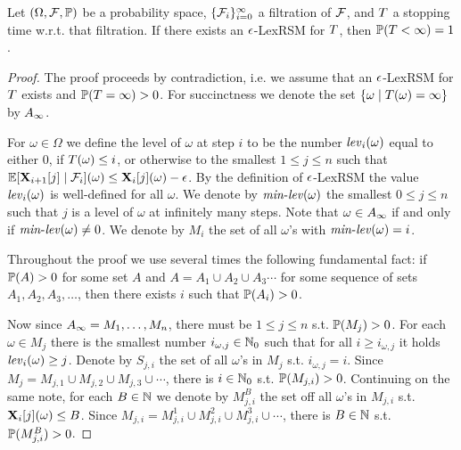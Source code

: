 \begin{theorem}
Let $(\Omega,\mathcal{F},\mathbb{P})$ be a probability space, 
$\{\mathcal{F}_i\}_{i=0}^{\infty}$ a filtration of $\mathcal{F}$, and $T$ a 
stopping 
time w.r.t. that filtration. If there exists an $\epsilon$-LexRSM for $T$, 
then $\mathbb{P}(T<\infty)=1$.
\end{theorem}
\begin{proof}
The proof proceeds by contradiction, i.e. we assume that an $\epsilon$-LexRSM for 
$T$ exists and $\mathbb{P}(T=\infty)>0$. For succinctness we denote the 
set $\{\omega\mid T(\omega)=\infty\}$ by $A_{\infty}$.

For $\omega\in \Omega$ we define the level of $\omega$ at step $i$ to be the 
number $\mathit{lev}_{i}(\omega)$ equal to either $0$, if $T(\omega)\leq i$, 
or otherwise to the smallest $1\leq j \leq n$ such that 
$\mathbb{E}[\mathbf{X}_{i+1}[j]\mid 
\mathcal{F}_i](\omega)\leq\mathbf{X}_{i}[j](\omega)-\epsilon$. By the definition of 
$\epsilon$-LexRSM the value $\mathit{lev}_{i}(\omega)$ is well-defined for all 
$\omega$. We denote by $\mathit{min}\text{-}\mathit{lev}(\omega)$ the smallest $0 \leq j \leq n$ such 
that $j$ is a level of $\omega$ at infinitely many steps. Note that $\omega \in 
A_{\infty}$ if and only if $\mathit{min}\text{-}\mathit{lev}(\omega)\neq 0$. We denote by $M_i$ 
the set of all $\omega$'s with $\mathit{min}\text{-}\mathit{lev}(\omega)=i$.

Throughout the proof we use several times the following fundamental fact: if 
$\mathbb{P}(A)>0$ for some set $A$ and $A=A_1\cup A_2 \cup A_3\cdots$ for some 
sequence of sets $A_1,A_2,A_3,\dots$, then there exists $i$ such that 
$\mathbb{P}(A_i)>0$.

Now since $A_{\infty}=M_1,\dots,M_n$, there must be $1\leq j \leq n$ 
s.t. $\mathbb{P}(M_j)>0$. For each $\omega\in M_j$ there is the smallest number
$i_{\omega,j}\in\mathbb{N}_0$ such that for all $i\geq i_{\omega,j}$ it holds 
$\mathit{lev}_{i}(\omega)\geq 
j$. Denote by $S_{j,i}$ the set of all $\omega$'s in $M_j$ s.t. 
$i_{\omega,j}=i$. 
Since $M_j = M_{j,1} \cup M_{j,2} \cup M_{j,3} \cup \cdots$, there is $i\in 
\mathbb{N}_0$ 
s.t. 
$\mathbb{P}(M_{j,i})>0$. Continuing on the same note, for each $B\in \mathbb{N}$ we 
denote by $M_{j,i}^{B}$ the set off all $\omega$'s in $M_{j,i}$ s.t. 
$\mathbf{X}_{i}[j](\omega)\leq B$. Since $M_{j,i}= M_{j,i}^{1} \cup M_{j,i}^{2} 
\cup M_{j,i}^{3} \cup \cdots  $, there is $B\in \mathbb{N}$ s.t. 
$\mathbb{P}(M_{j,i}^{B})>0$.


	


% 
\end{proof}